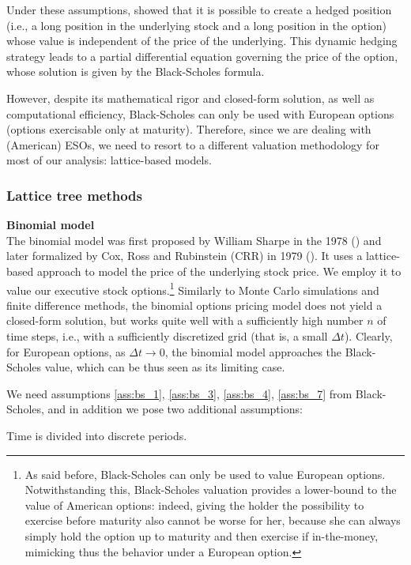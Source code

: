     Under these assumptions, \cite{black1973pricing} showed that it is possible to create a hedged position (i.e., a long position in the underlying stock and a long position in the option) whose value is independent of the price of the underlying. This dynamic hedging strategy leads to a partial differential equation governing the price of the option, whose solution is given by the Black-Scholes formula.

    However, despite its mathematical rigor and closed-form solution, as well as computational efficiency, Black-Scholes can only be used with European options (options exercisable only at maturity). Therefore, since we are dealing with (American) ESOs, we need to resort to a different valuation methodology for most of our analysis: lattice-based models.

\subsubsection*{Lattice tree methods} 
\textbf{Binomial model}\\
The binomial model was first proposed by William Sharpe in the 1978 (\cite{sharpe1978investments}) and later formalized by Cox, Ross and Rubinstein (CRR) in 1979 (\cite{cox1979option}). It uses a lattice-based approach to model the price of the underlying stock price. We employ it to value our executive stock options.\footnote{As said before, Black-Scholes can only be used to value European options. Notwithstanding this, Black-Scholes valuation provides a lower-bound to the value of American options: indeed, giving the holder the possibility to exercise before maturity also cannot be worse for her, because she can always simply hold the option up to maturity and then exercise if in-the-money, mimicking thus the behavior under a European option.}
Similarly to Monte Carlo simulations and finite difference methods, the binomial options pricing model does not yield a closed-form solution, but works quite well with a sufficiently high number $n$ of time steps, i.e., with a sufficiently discretized grid (that is, a small $\Delta t$). Clearly, for European options, as $\Delta t \rightarrow 0$, the binomial model approaches the Black-Scholes value, which can be thus seen as its limiting case.

We need assumptions \ref*{ass:bs_1}, \ref*{ass:bs_3}, \ref*{ass:bs_4}, \ref*{ass:bs_7} from Black-Scholes, and in addition we pose two additional assumptions:

\begin{assumption}
    \label{ass:bin_8}
    Time is divided into discrete periods.
\end{assumption}

